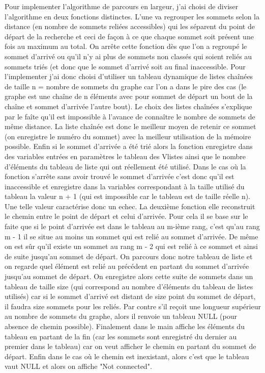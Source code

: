 \documentclass[a4paper, 11pt]{report}
\begin{document}
\vspace{2\baselineskip}
Pour implementer l'algorithme de parcours en largeur, j'ai choisi de diviser l'algorithme en deux fonctions distinctes.
\newline
L'une va regrouper les sommets selon la distance (en nombre de sommets reliées accessibles) qui les séparent du point de départ de la recherche et ceci de façon à ce que chaque sommet soit présent une fois au maximum au total. On arrête cette fonction dès que l'on a regroupé le sommet d'arrivé ou qu'il n'y ai plus de sommets non classés qui soient reliés au sommets triés (et donc que le sommet d'arrivé soit au final inaccessible. Pour l'implementer j'ai donc choisi d'utiliser un tableau dynamique de listes chaînées de taille n = nombre de sommets du graphe car l'on a dans le pire des cas (le graphe est une chaîne de n éléments avec pour sommet de départ un bout de la chaîne et sommet d'arrivée l'autre bout). Le choix des listes chaînées s'explique par le faîte qu'il est impossible à l'avance de connaître le nombre de sommets de même distance. La liste chaînée est donc le meilleur moyen de retenir ce sommet (on enregistre le numéro du sommet) avec la meilleur utilisation de la mémoire possible. Enfin si le sommet d'arrivée a été trié alors la fonction enregistre dans des variables entrées en paramètres le tableau des Vlistes ainsi que le nombre d'éléments du tableau de liste qui ont réellement été utilisé. Dans le cas où la fonction s'arrête sans avoir trouvé le sommet d'arrivée c'est donc qu'il est inaccessible et enregistre dans la variables correspondant à la taille utilisé du tableau la valeur n + 1 (qui est impossible car le tableau est de taille réelle n). Une telle valeur caractérise donc un echec.
\newline
La deuxième fonction elle reconstruit le chemin entre le point de départ et celui d'arrivée. Pour cela il se base sur le faite que si le point d'arrivée est dans le tableau au m-ième rang, c'est qu'au rang m - 1 il se situe au moins un sommet qui est relié au sommet d'arrivée. De même on est sûr qu'il existe un sommet au rang m - 2 qui est relié à ce sommet et ainsi de suite jusqu'au sommet de départ.
On parcours donc notre tableau de liste et on regarde quel élément est relié au précédent en partant du sommet d'arrivée jusqu'au sommet de départ. On enregistre alors cette suite de sommets dans un tableau de taille size (qui correspond au nombre d'éléments du tableau de listes utilisés) car si le sommet d'arrivé est distant de size point du sommet de départ, il faudra size sommets pour les reliés.
Par contre s'il reçoit une longueur supérieur au nombre de sommets du graphe, alors il renvoie un tableau NULL (pour absence de chemin possible).
\newline
Finalement dans le main affiche les éléments du tableau en partant de la fin (car les sommets sont enregistré du dernier au premier dans le tableau) car on veut afficher le chemin en partant du sommet de départ. Enfin dans le cas où le chemin est inexistant, alors c'est que le tableau vaut NULL et alors on affiche "Not connected".
\end{document}
